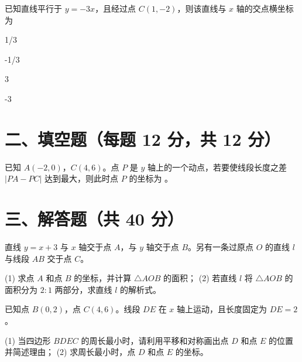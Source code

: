 \documentclass{exam-zh}
\newcommand{\answerarea}[1][40mm]{%
  \vspace{2mm}%
  \begin{tcolorbox}[
    enhanced, breakable,
    colback=white,
    colframe=white,
    boxrule=0pt,
    height=#1,
    valign=top,
    bottom=0mm,
    after skip=0mm,
  ]
  \end{tcolorbox}%
}
\begin{document}
\begin{question}[points=12]
  已知直线平行于 $y = -3x$，且经过点 $C(1, -2)$，则该直线与 $x$ 轴的交点横坐标为
  \begin{choices}
    \item 1/3
    \item -1/3
    \item 3
    \item -3
  \end{choices}
\end{question}


\section*{二、填空题（每题 12 分，共 12 分）}


\begin{question}[points=12]
  已知 $A(-2, 0)$，$C(4, 6)$。点 $P$ 是 $y$ 轴上的一个动点，若要使线段长度之差 $|PA - PC|$ 达到最大，则此时点 $P$ 的坐标为 \fillin。
\end{question}


\section*{三、解答题（共 40 分）}


\begin{problem}[points=20]
  直线 $y = x + 3$ 与 $x$ 轴交于点 $A$，与 $y$ 轴交于点 $B$。另有一条过原点 $O$ 的直线 $l$ 与线段 $AB$ 交于点 $C$。

(1) 求点 $A$ 和点 $B$ 的坐标，并计算 $\triangle AOB$ 的面积；
(2) 若直线 $l$ 将 $\triangle AOB$ 的面积分为 $2:1$ 两部分，求直线 $l$ 的解析式。
  \answerarea[60mm]
\end{problem}



\begin{problem}[points=20]
  已知点 $B(0, 2)$，点 $C(4, 6)$。线段 $DE$ 在 $x$ 轴上运动，且长度固定为 $DE = 2$。

(1) 当四边形 $BDEC$ 的周长最小时，请利用平移和对称画出点 $D$ 和点 $E$ 的位置并简述理由；
(2) 求周长最小时，点 $D$ 和点 $E$ 的坐标。
  \answerarea[60mm]
\end{problem}
\end{document}

